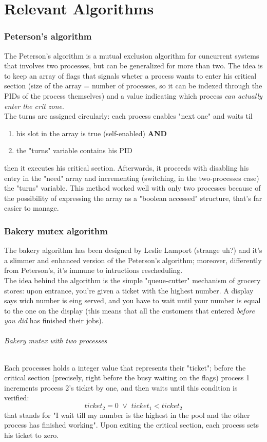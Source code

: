 \documentclass{article}
\begin{document}
	\part{Relevant Algorithms}
		\section{Peterson's algorithm}
			The Peterson's algorithm is a mutual exclusion algorithm for cuncurrent systems that involves two processes, but can be generalized for more than two. The idea is to keep an array of flags that signals wheter a process wants to enter his critical section (size of the array = number of processes, so it can be indexed through the PIDs of the process themselves) and a value indicating which process \emph{can actually enter the crit zone}.\\
			The turns are assigned circularly: each process enables "next one" and waits til
			\begin{enumerate}
				\item his slot in the array is true (self-enabled) \textbf{AND}
				\item the "turns" variable contains his PID
			\end{enumerate}
			then it executes his critical section. Afterwards, it proceeds with disabling his entry in the "need" array and incrementing (switching, in the two-processes case) the "turns" variable.
			This method worked well with only two processes because of the possibility of expressing the array as a "boolean accessed" structure, that's far easier to manage.
			
		\section{Bakery mutex algorithm}
			The bakery algorithm has been designed by Leslie Lamport (strange uh?) and it's a slimmer and enhanced version of the Peterson's algorithm; moreover, differently from Peterson's, it's immune to intructions rescheduling.\\
			The idea behind the algorithm is the simple "queue-cutter" mechanism of grocery stores: upon entrance, you're given a ticket with the highest number. A display says wich number is eing served, and you have to wait until your number is equal to the one on the display (this means that all the customers that entered \emph{before you did} has finished their jobs).
			
			\paragraph{Bakery mutex with two processes}
				Each processes holds a integer value that represents their "ticket"; before the critical section (precisely, right before the busy waiting on the flags) process 1 increments process 2's ticket by one, and then waits until this condition is verified:
				\begin{equation}
					ticket_2 = 0\,\,\vee\,\, ticket_1 < ticket_2 
				\end{equation}
				that stands for "I wait till my number is the highest in the pool and the other process has finished working". Upon exiting the critical section, each process sets his ticket to zero.
				
\end{document}
